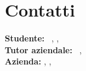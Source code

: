 \section*{Contatti}
\textbf{Studente:} \nomeStudente\ \cognomeStudente, \href{mailto:\emailStudente}{\emailStudente}, \telStudente \\
\textbf{Tutor aziendale:} \nomeTutorAziendale\ \cognomeTutorAziendale, \telTutorAziendale  \\%
\textbf{Azienda:} \ragioneSocAzienda, \indirizzoAzienda, \href{\sitoAzienda}{\sitoAzienda}